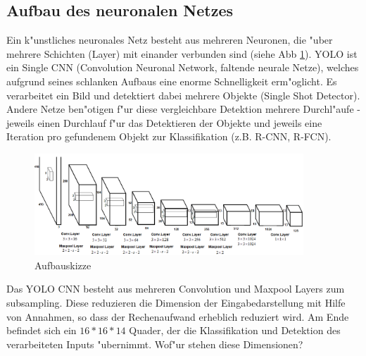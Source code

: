 \subsection{Aufbau des neuronalen Netzes}
\label{sec:cnn_aufbau}
Ein k"unstliches neuronales Netz besteht aus mehreren Neuronen, die "uber mehrere Schichten (Layer) mit einander verbunden sind (siehe Abb \ref{fig:neunet}). YOLO ist ein Single CNN (Convolution Neuronal Network, faltende neurale Netze),
welches aufgrund seines schlanken Aufbaus eine enorme Schnelligkeit erm"oglicht. Es verarbeitet ein Bild und detektiert dabei mehrere Objekte (Single Shot Detector). Andere Netze ben"otigen f"ur diese vergleichbare Detektion mehrere Durchl"aufe - jeweils einen Durchlauf f"ur das Detektieren der Objekte und jeweils eine Iteration pro gefundenem Objekt zur Klassifikation (z.B. R-CNN, R-FCN).

\begin{figure}[h]
	\centering
	\includegraphics[width=0.90\textwidth]{images/aufbauskizze}
	\caption{Aufbauskizze}
	\label{fig:neunet}
\end{figure}

Das YOLO CNN besteht aus mehreren Convolution und Maxpool Layers zum subsampling.
Diese reduzieren die Dimension der Eingabedarstellung mit Hilfe von Annahmen,
so dass der Rechenaufwand erheblich reduziert wird. Am Ende befindet sich ein $16*16*14$ Quader, der die Klassifikation und Detektion des verarbeiteten Inputs "ubernimmt. Wof"ur stehen diese Dimensionen?

